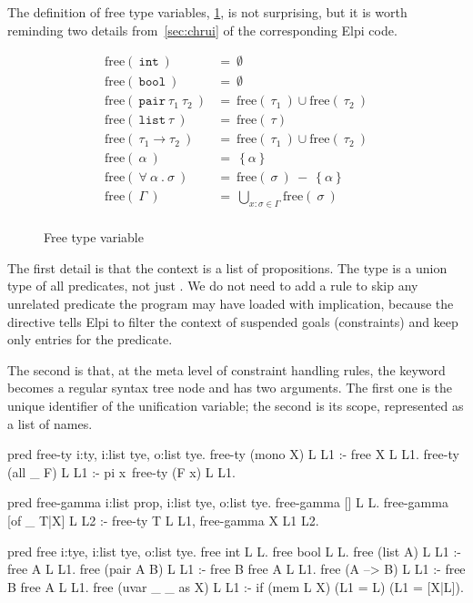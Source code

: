 \documentclass[a4paper, 11pt]{book}
\begin{document}
The definition of free type variables, \cref{img:free}, is not surprising,
but it is worth reminding two details 
from~\cref{sec:chrui} of the corresponding Elpi code.

\begin{figure}
$$
\begin{array}{ll}
  \text{free}(\ \mathtt{int}\ ) &=\ \emptyset\\
  \text{free}(\ \mathtt{bool}\ ) &=\ \emptyset\\
  \text{free}(\ \mathtt{pair}\ \tau_1\ \tau_2\ ) &=\ \text{free}(\ \tau_1\ )\cup \text{free}(\ \tau_2\ ) \\
  \text{free}(\ \mathtt{list}\ \tau\ ) &=\ \text{free}(\ \tau ) \\
  \text{free}(\ \tau_1 \to \tau_2\ ) &=\ \text{free}(\ \tau_1\ )\cup \text{free}(\ \tau_2\ ) \\
  \text{free}(\ \alpha\ ) &=\ \left\{\alpha\right\}\\
  \text{free}(\ \forall\ \alpha\ .\ \sigma\ ) &=\ \text{free}(\ \sigma\ )\  -\  \left\{\alpha\right\}\\
  \text{free}(\ \Gamma\ ) &=\ \bigcup\limits_{x:\sigma \in \Gamma}\text{free}(\ \sigma\ )\\
\end{array}
$$
\caption{Free type variable\label{img:free}}
\end{figure}


The first detail is that the context is a list of propositions. The
 type is a union type of all predicates, not just .
We do not need to add a rule to skip any unrelated predicate
the program may have loaded with implication, because the  directive tells Elpi to filter the context of suspended goals
(constraints) and keep only entries for the  predicate.

The second is that, at the meta level of constraint handling rules, the
 keyword becomes a regular syntax tree node and has two arguments.
The first one is the unique identifier of the unification variable; the second is
its scope, represented as a list of names.

\begin{elpicode}
pred free-ty i:ty, i:list tye, o:list tye.
free-ty (mono X) L L1 :- free X L L1.
free-ty (all _ F) L L1 :- pi x\ free-ty (F x) L L1.

pred free-gamma i:list prop, i:list tye, o:list tye.
free-gamma [] L L.
free-gamma [of _ T|X] L L2 :- free-ty T L L1, free-gamma X L1 L2.

pred free i:tye, i:list tye, o:list tye.
free int L L.
free bool L L.
free (list A) L L1 :- free A L L1.
free (pair A B) L L1 :- free B {free A L} L1.
free (A --> B) L L1 :- free B {free A L} L1.
free (uvar _ _ as X) L L1 :- if (mem L X) (L1 = L) (L1 = [X|L]).
\end{elpicode}
\end{document}
